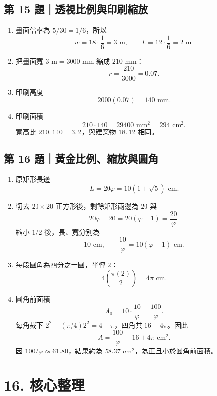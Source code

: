 \documentclass[11pt,a4paper]{article}
\providecommand{\tightlist}{%
  \setlength{\itemsep}{0pt}\setlength{\parskip}{0pt}}
\begin{document}
\subsection{第 15 題｜透視比例與印刷縮放}\label{ux7b2c-15-ux984cux900fux8996ux6bd4ux4f8bux8207ux5370ux5237ux7e2eux653e}

\begin{enumerate}
\def\labelenumi{\arabic{enumi}.}
\tightlist
\item
  畫面倍率為 \(5/30=1/6\)，所以
  \[
  w=18\cdot\frac16=3\text{ m},\qquad
  h=12\cdot\frac16=2\text{ m}.
  \]
\item
  把畫面寬 \(3\text{ m}=3000\text{ mm}\) 縮成 \(210\text{ mm}\)：
  \[
  r=\frac{210}{3000}=0.07.
  \]
\item
  印刷高度
  \[
  2000(0.07)=140\text{ mm}.
  \]
\item
  印刷面積
  \[
  210\cdot140=29400\text{ mm}^2=294\text{ cm}^2.
  \]
  寬高比 \(210:140=3:2\)，與建築物 \(18:12\) 相同。
\end{enumerate}

\subsection{第 16 題｜黃金比例、縮放與圓角}\label{ux7b2c-16-ux984cux9ec3ux91d1ux6bd4ux4f8bux7e2eux653eux8207ux5713ux89d2}

\begin{enumerate}
\def\labelenumi{\arabic{enumi}.}
\tightlist
\item
  原矩形長邊
  \[
  L=20\varphi=10(1+\sqrt5)\text{ cm}.
  \]
\item
  切去 \(20\times20\) 正方形後，剩餘矩形兩邊為 \(20\) 與
  \[
  20\varphi-20=20(\varphi-1)=\frac{20}{\varphi}.
  \]
  縮小 \(1/2\) 後，長、寬分別為
  \[
  10\text{ cm},\qquad \frac{10}{\varphi}=10(\varphi-1)\text{ cm}.
  \]
\item
  每段圓角為四分之一圓，半徑 \(2\)：
  \[
  4\left(\frac{\pi(2)}2\right)=4\pi\text{ cm}.
  \]
\item
  圓角前面積
  \[
  A_0=10\cdot\frac{10}{\varphi}=\frac{100}{\varphi}.
  \]
  每角裁下 \(2^2-(\pi/4)2^2=4-\pi\)，四角共 \(16-4\pi\)。因此
  \[
  A=\frac{100}{\varphi}-16+4\pi\text{ cm}^2.
  \]
  因 \(100/\varphi\approx61.80\)，結果約為 \(58.37\text{ cm}^2\)，為正且小於圓角前面積。
\end{enumerate}

\section{16. 核心整理}\label{ux6838ux5fc3ux6574ux7406}
\end{document}
